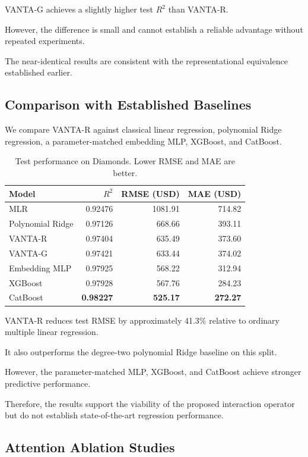 \documentclass[11pt,a4paper]{article}
\begin{document}
VANTA-G achieves a slightly higher
test $R^2$ than VANTA-R.

However, the difference is small and
cannot establish a reliable advantage
without repeated experiments.

The near-identical results are
consistent with the representational
equivalence established earlier.

\subsection{Comparison with Established Baselines}

We compare VANTA-R against classical
linear regression, polynomial Ridge
regression, a parameter-matched
embedding MLP, XGBoost, and CatBoost.

\begin{table}[ht]
\centering
\caption{Test performance on Diamonds.
Lower RMSE and MAE are better.}
\label{tab:baselines}
\small
\begin{tabular}{lrrr}
\toprule
Model & $R^2$ & RMSE (USD) & MAE (USD)\\
\midrule
MLR & 0.92476 & 1081.91 & 714.82\\
Polynomial Ridge & 0.97126 & 668.66 & 393.11\\
VANTA-R & 0.97404 & 635.49 & 373.60\\
VANTA-G & 0.97421 & 633.44 & 374.02\\
Embedding MLP & 0.97925 & 568.22 & 312.94\\
XGBoost & 0.97928 & 567.76 & 284.23\\
CatBoost & \textbf{0.98227} & \textbf{525.17}
& \textbf{272.27}\\
\bottomrule
\end{tabular}
\end{table}

VANTA-R reduces test RMSE by approximately
41.3\% relative to ordinary multiple
linear regression.

It also outperforms the degree-two
polynomial Ridge baseline on this split.

However, the parameter-matched MLP,
XGBoost, and CatBoost achieve stronger
predictive performance.

Therefore, the results support the
viability of the proposed interaction
operator but do not establish
state-of-the-art regression performance.

\subsection{Attention Ablation Studies}
\end{document}

